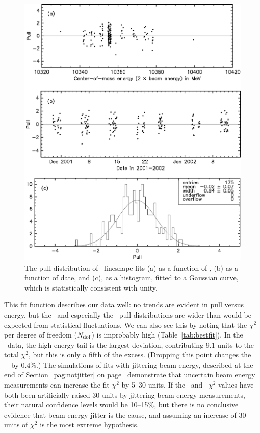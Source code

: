 \documentclass{cornell}
\begin{document}
\begin{figure}[p]
  \begin{center}
    \includegraphics[width=\linewidth]{pullsthree}
  \end{center}
  \caption[Pull distributions for \usss]{\label{pullsthree} The pull distribution of \usss\
  lineshape fits (a) as a function of \ecm, (b) as a function of date,
  and (c), as a histogram, fitted to a Gaussian curve, which is
  statistically consistent with unity.}
\end{figure}

This fit function describes our data well: no trends are evident in
pull versus energy, but the \us\ and especially the \uss\ pull
distributions are wider than would be expected from statistical
fluctuations.  We can also see this by noting that the $\chi^2$ per
degree of freedom ($N_{\mbox{\scriptsize dof}}$) is improbably high
(Table~\ref{tab:bestfit}).  In the \uss\ data, the high-energy tail is
the largest deviation, contributing 9.1 units to the total $\chi^2$,
but this is only a fifth of the excess.  (Dropping this point changes
the \uss\ \geehadtot\ by 0.4\%.)  The simulations of fits with
jittering beam energy, described at the end of
Section~\ref{pag:notjitter} on page~\pageref{pag:notjitter}
demonstrate that uncertain beam energy measurements can increase the
fit $\chi^2$ by 5--30 units.  If the \us\ and \uss\ $\chi^2$ values
have both been artificially raised 30 units by jittering beam energy
measurements, their natural confidence levels would be 10--15\%, but
there is no conclusive evidence that beam energy jitter is the cause,
and assuming an increase of 30 units of $\chi^2$ is the most extreme
hypothesis.
\end{document}
